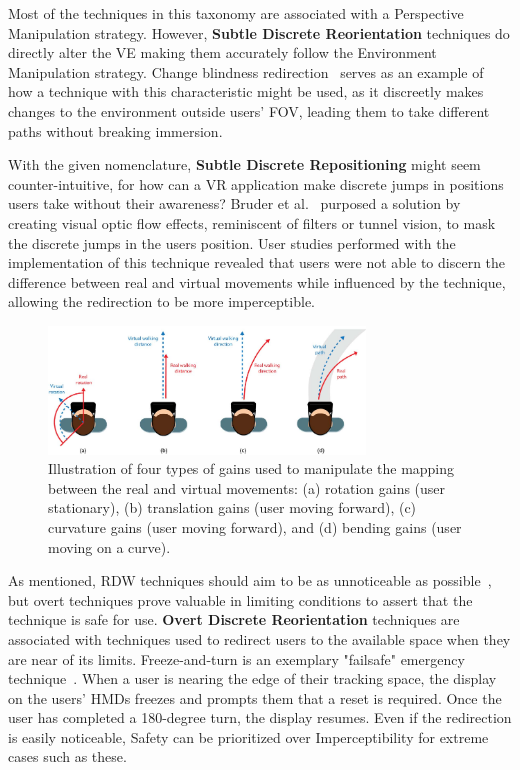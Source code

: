 Most of the techniques in this taxonomy are associated with a Perspective Manipulation strategy. However, 
\textbf{Subtle Discrete Reorientation} techniques do directly alter the \gls{VE} making them accurately follow the
Environment Manipulation strategy. Change blindness redirection~\cite{5759455} serves as an example of how a technique 
with this characteristic might be used, as it discreetly makes changes to the environment outside users' \gls{FOV}, leading them to take different 
paths without breaking immersion.

With the given nomenclature, \textbf{Subtle Discrete Repositioning} might seem counter-intuitive, for how can a \gls{VR} application 
make discrete jumps in positions users take without their awareness? Bruder et al.~\cite{Bruder2011} purposed a solution by creating visual 
optic flow effects, reminiscent of filters or tunnel vision, to mask the discrete jumps in the users position. User studies performed 
with the implementation of this technique revealed that users were not able to discern the difference between real and virtual movements 
while influenced by the technique, allowing the redirection to be more imperceptible.

\begin{figure}[t]
    \centering
    \includegraphics[width=0.75\textwidth]{NOVAthesisFiles/Images/papers/rdw-gains.png}
    \caption[Illustration of types of redirection gains]{Illustration of four types of gains used to manipulate the mapping between the real
    and virtual movements: (a) rotation gains (user stationary), (b) translation gains (user moving
    forward), (c) curvature gains (user moving forward), and (d) bending gains (user moving on a
    curve).~\cite{8255772}}
    \label{fig:rdw-gains}
\end{figure}

As mentioned, \gls{RDW} techniques should aim to be as unnoticeable as possible~\cite{8255772}, but overt techniques prove valuable in 
limiting conditions to assert that the technique is safe for use. \textbf{Overt Discrete Reorientation} techniques are associated with 
techniques used to redirect users to the available space when they are near of its limits. Freeze-and-turn is an exemplary 
"failsafe" emergency technique~\cite{Williams2007}. When a user is nearing the edge of 
their tracking space, the display on the users' \glspl{HMD} freezes and prompts them that 
a reset is required. Once the user has completed a 180-degree turn, the display resumes. 
Even if the redirection is easily noticeable, Safety can be prioritized over 
Imperceptibility for extreme cases such as these.

